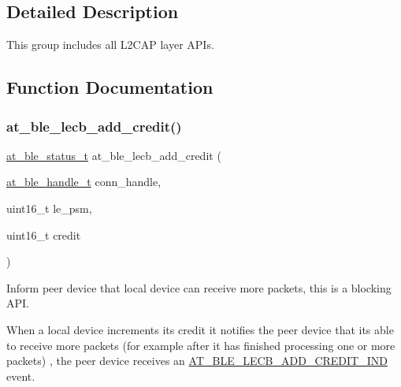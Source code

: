 \subsection{Detailed Description}
This group includes all L2\+C\+AP layer A\+P\+Is. 



\subsection{Function Documentation}
\mbox{\label{group__l2cap__group_ga48aebfd5595b6064804c582ecc554bfe}} 
\subsubsection{\texorpdfstring{at\_ble\_lecb\_add\_credit()}{at\_ble\_lecb\_add\_credit()}}
{\footnotesize\ttfamily \mbox{\hyperlink{group__error__codes__group_ga3b1db9b95feb157b3c188ca27fe76988}{at\+\_\+ble\+\_\+status\+\_\+t}} at\+\_\+ble\+\_\+lecb\+\_\+add\+\_\+credit (\begin{DoxyParamCaption}\item[{\mbox{\hyperlink{at__ble__api_8h_abd23646d0c662860741f787efc8456f2}{at\+\_\+ble\+\_\+handle\+\_\+t}}}]{conn\+\_\+handle,  }\item[{uint16\+\_\+t}]{le\+\_\+psm,  }\item[{uint16\+\_\+t}]{credit }\end{DoxyParamCaption})}



Inform peer device that local device can receive more packets, this is a blocking A\+PI. 

When a local device increments its credit it notifies the peer device that it\textquotesingle{}s able to receive more packets (for example after it has finished processing one or more packets) , the peer device receives an \mbox{\hyperlink{at__ble__api_8h_a3324640b95f33169515f89738ed5baebaf2cacdabac494c8b868713acb484e1e7}{A\+T\+\_\+\+B\+L\+E\+\_\+\+L\+E\+C\+B\+\_\+\+A\+D\+D\+\_\+\+C\+R\+E\+D\+I\+T\+\_\+\+I\+ND}} event.



